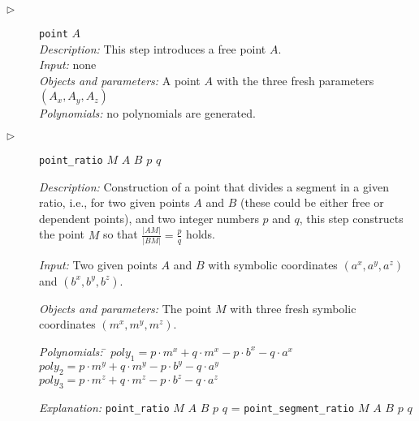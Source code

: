 \documentclass[final,1p,times,authoryear]{elsarticle}
\begin{document}
\begin{description}

\item[$\triangleright$] {\tt point} $A$ \\
  {\em Description:} This step introduces a free point $A$.\\
  {\em Input:} none\\
  {\em Objects and parameters:} A point $A$ with the three fresh parameters
  $(A_x, A_y, A_z)$ \\
  {\em Polynomials:} no polynomials are generated. \\

\item[$\triangleright$] {\tt point\_ratio} $M$ $A$ $B$ $p$ $q$ 

  {\em Description:} Construction of a point that divides a segment in
  a given ratio, i.e., for two given points $A$ and $B$ (these could
  be either free or dependent points), and two integer numbers $p$ and
  $q$, this step constructs the point $M$ so that
  $\frac{|AM|}{|BM|} = \frac{p}{q}$ holds.


  {\em Input:} Two given points $A$ and $B$ with symbolic
  coordinates $(a^x, a^y, a^z)$ and $(b^x, b^y, b^z)$.

  {\em Objects and parameters: } The point $M$ with three fresh
  symbolic coordinates $(m^x, m^y, m^z)$.

\begin{tabbing}
{\em Polynomials:} \= $poly_1 = p\cdot m^x + q\cdot m^x - p\cdot b^x - q\cdot a^x$ \\
                   \> $poly_2 = p\cdot m^y + q\cdot m^y - p\cdot b^y - q\cdot a^y$ \\
                   \> $poly_3 = p\cdot m^z + q\cdot m^z - p\cdot b^z - q\cdot a^z$ 
\end{tabbing}

{\em Explanation:} {\tt point\_ratio} $M$ $A$ $B$ $p$ $q$ = {\tt point\_segment\_ratio} $M$ $A$ $B$ $p$ $q$


\end{description}
\end{document}
